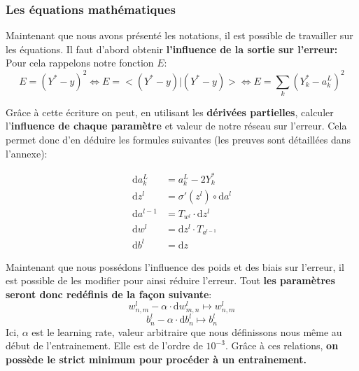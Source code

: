 \documentclass[12pt,a4paper]{extarticle}
\newcommand{\ud}{\mathrm{d}}
\begin{document}
\subsubsection{Les équations mathématiques}
Maintenant que nous avons présenté les notations, il est possible de travailler sur les équations. Il faut d'abord obtenir \textbf{l'influence de la sortie sur l'erreur:} \\
Pour cela rappelons notre fonction $E$:
\[E=(Y^*-y)^2\Leftrightarrow E = <(Y^*-y)|(Y^*-y)> \Leftrightarrow E = \sum_k(Y^*_k-a^L_k)^2 \]

Grâce à cette écriture on peut, en utilisant les \textbf{dérivées partielles}, calculer l'\textbf{influence de chaque paramètre} et valeur de notre réseau sur l'erreur. Cela permet donc d'en déduire les formules suivantes (les preuves sont détaillées dans l'annexe):

\begin{align}
\ud a^L_k&=a^L_k-2Y^*_k\\
\ud z^l&= \sigma'(z^l) \circ \ud a^l \\
\ud a^{l-1}&=T_{w^l}\cdot \ud z^l\\
\ud w^l&=\ud z^l\cdot T_{a^{l-1}}\\
\ud b^l&=\ud z
\end{align}

Maintenant que nous possédons l'influence des poids et des biais sur l'erreur, il est possible de les modifier pour ainsi réduire l'erreur. Tout \textbf{les paramètres seront donc redéfinis de la façon suivante}:
\[w^l_{n,m} - \alpha\cdot \ud w^l_{m,n}\mapsto w^l_{n,m}\]
\[b^l_n - \alpha \cdot \ud b^l_n \mapsto b^l_n\]
Ici, $\alpha$ est le learning rate, valeur arbitraire que nous définissons nous même au début de l'entrainement. Elle est de l'ordre de $10^{-3}$. Grâce à ces relations, \textbf{on possède le strict  minimum pour procéder à un entrainement.} \\
\end{document}
